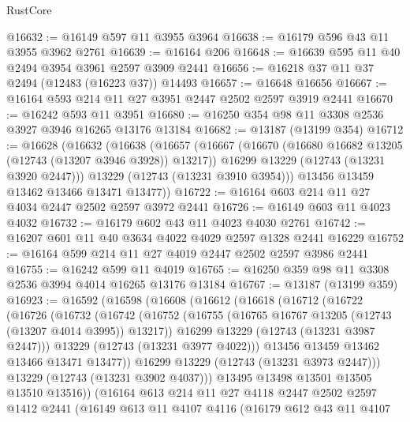 \begin{lexlean}{RustCore}
\begin{coremodule}
@16632 := @16149 @597 @11 @3955 @3964
@16638 := @16179 @596 @43 @11 @3955 @3962 @2761
@16639 := @16164 @206
@16648 := @16639 @595 @11 @40 @2494 @3954 @3961 @2597 @3909 @2441
@16656 := @16218 @37 @11 @37 @2494 (@12483 (@16223 @37)) @14493
@16657 := @16648 @16656
@16667 := @16164 @593 @214 @11 @27 @3951 @2447 @2502 @2597 @3919 @2441
@16670 := @16242 @593 @11 @3951
@16680 := @16250 @354 @98 @11 @3308 @2536 @3927 @3946 @16265 @13176 @13184
@16682 := @13187 (@13199 @354)
@16712 := @16628
    (@16632
      (@16638
        (@16657
          (@16667
            (@16670 (@16680 @16682 @13205 (@12743 (@13207 @3946 @3928)) @13217))
            @16299
            @13229
            (@12743 (@13231 @3920 @2447)))
          @13229
          (@12743 (@13231 @3910 @3954)))
        @13456
        @13459
        @13462
        @13466
        @13471
        @13477))
@16722 := @16164 @603 @214 @11 @27 @4034 @2447 @2502 @2597 @3972 @2441
@16726 := @16149 @603 @11 @4023 @4032
@16732 := @16179 @602 @43 @11 @4023 @4030 @2761
@16742 := @16207 @601 @11 @40 @3634 @4022 @4029 @2597 @1328 @2441 @16229
@16752 := @16164 @599 @214 @11 @27 @4019 @2447 @2502 @2597 @3986 @2441
@16755 := @16242 @599 @11 @4019
@16765 := @16250 @359 @98 @11 @3308 @2536 @3994 @4014 @16265 @13176 @13184
@16767 := @13187 (@13199 @359)
@16923 := @16592
    (@16598
      (@16608
        (@16612
          (@16618
            (@16712
              (@16722
                (@16726
                  (@16732
                    (@16742
                      (@16752
                        (@16755 (@16765 @16767 @13205 (@12743 (@13207 @4014 @3995)) @13217))
                        @16299
                        @13229
                        (@12743 (@13231 @3987 @2447)))
                      @13229
                      (@12743 (@13231 @3977 @4022)))
                    @13456
                    @13459
                    @13462
                    @13466
                    @13471
                    @13477))
                @16299
                @13229
                (@12743 (@13231 @3973 @2447)))
              @13229
              (@12743 (@13231 @3902 @4037)))
            @13495
            @13498
            @13501
            @13505
            @13510
            @13516))
        (@16164
          @613
          @214
          @11
          @27
          @4118
          @2447
          @2502
          @2597
          @1412
          @2441
          (@16149
            @613
            @11
            @4107
            @4116
            (@16179
              @612
              @43
              @11
              @4107

\end{coremodule}
\end{lexlean}
